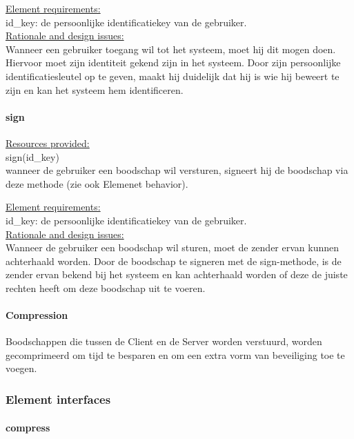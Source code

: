 \documentclass[a4paper,10pt]{article}
\begin{document}
\underline{Element requirements:}\\
id\_key: de persoonlijke identificatiekey van de gebruiker.\\

\underline{Rationale and design issues:}\\
Wanneer een gebruiker toegang wil tot het systeem, moet hij dit mogen doen. Hiervoor moet zijn identiteit gekend zijn in het systeem. Door zijn persoonlijke identificatiesleutel op te geven, maakt hij duidelijk dat hij is wie hij beweert te zijn en kan het systeem hem identificeren.\\

\paragraph{sign}

\underline{Resources provided:}\\
sign(id\_key)\\
wanneer de gebruiker een boodschap wil versturen, signeert hij de boodschap via deze methode (zie ook Elemenet behavior).

\underline{Element requirements:}\\
id\_key: de persoonlijke identificatiekey van de gebruiker.\\

\underline{Rationale and design issues:}\\
Wanneer de gebruiker een boodschap wil sturen, moet de zender ervan kunnen achterhaald worden. Door de boodschap te signeren met de sign-methode, is de zender ervan bekend bij het systeem en kan achterhaald worden of deze de juiste rechten heeft om deze boodschap uit te voeren.\\

\paragraph{Compression}
Boodschappen die tussen de Client en de Server worden verstuurd, worden gecomprimeerd om tijd te besparen en om een extra vorm van beveiliging toe te voegen.

\subsubsection{Element interfaces}

\paragraph{compress}
\end{document}

